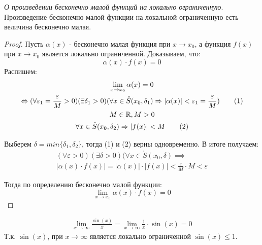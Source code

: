 \begin{theorem}
  \textit{О произведении бесконечно малой функций на локально ограниченную}. \\
  Произведение бесконечно малой функции на локальной ограниченную есть величина бесконечно малая.
\end{theorem}
\begin{proof}
  Пусть $\alpha(x)$ - бесконечно малая функция при $x \to x_0$, а функция $f(x)$ при $x \to  x_0$ является локально ограниченной. Доказываем, что: \[
  \alpha(x) \cdot f(x) = 0
  \] 
  Распишем:
  \begin{gather*}
    \lim_{x \to x_0} \alpha(x) = 0 \\
    \iff (\forall \varepsilon_1 = \frac{\varepsilon}{M} > 0)(\exists \delta_1 > 0)(\forall x \in \mathring{S}(x_0, \delta_1) \implies |\alpha(x)| < \varepsilon_1 = \frac{\varepsilon}{M}) \tag{1}\\
    M \in \R, M > 0 \\
    \forall x \in  \mathring{S}(x_0, \delta_2) \implies |f(x)| < M \tag{2} \\ 
  \end{gather*}

  Выберем $\delta = min \{\delta_1, \delta_2\} $, тогда (1) и (2) верны одновременно. В итоге получаем:
  \begin{gather*}
    (\forall \varepsilon > 0)(\exists \delta > 0)(\forall x \in \mathring{S}(x_0, \delta) \implies \\
    |\alpha(x) \cdot f(x)| = |\alpha(x)| \cdot |f(x)| < \frac{\varepsilon}{M} \cdot M < \varepsilon  
  \end{gather*}

  Тогда по определению бесконечно малой функции:
  \[
  \lim_{x \to x_0} \alpha(x) \cdot f(x) = 0
  \] 
\end{proof}
\begin{eg}
  \begin{gather*}
    \lim_{x \to \infty} \frac{\sin(x)}{x} = \lim_{x \to \infty} \frac{1}{x} \cdot \sin(x) = 0
  \end{gather*}
  Т.к. $\sin(x)$, при $x \to \infty$ является локально ограниченной $\sin(x) \le 1$.
\end{eg}

